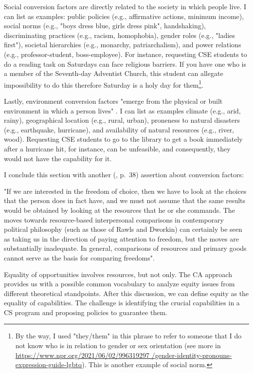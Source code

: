 Social conversion factors are directly related to the society in which people live. I can list as examples: public policies (e.g., affirmative actions, minimum income), social norms (e.g., "boys dress blue, girls dress pink", handshaking), discriminating practices (e.g., racism, homophobia), gender roles (e.g., "ladies first"), societal hierarchies (e.g., monarchy, patriarchalism), and power relations (e.g., professor-student, boss-employee). For instance, requesting \gls{CSE} students to do a reading task on Saturdays can face religious barriers. If you have one who is a member of the Seventh-day Adventist Church, this student can allegate impossibility to do this therefore Saturday is a holy day for them\footnote{By the way, I used "they/them" in this phrase to refer to someone that I do not know who is in relation to gender or sex orientation (see more in \url{https://www.npr.org/2021/06/02/996319297 /gender-identity-pronouns-expression-guide-lgbtq}). This is another example of social norm.}.

Lastly, environment conversion factors "emerge from the physical or built environment in which a person lives" \cite{robeyns:2023}. I can list as examples climate (e.g., arid, rainy), geographical location (e.g., rural, urban), proneness to natural disasters (e.g., earthquake, hurricane), and availability of natural resources (e.g., river, wood). Requesting \gls{CSE} students to go to the library to get a book immediately after a hurricane hit, for instance, can be unfeasible, and consequently, they would not have the capability for it.

I conclude this section with another  (\citeyear{sen:1992}, p.~38) assertion about conversion factors: 
\begin{citacao}
    "If we are interested in the freedom of choice, then we have to look at the choices that the person does in fact have, and we must not assume that the same results would be obtained by looking at the resources that he or she commands. The moves towards resource-based interpersonal comparisons in contemporary political philosophy (such as those of Rawls and Dworkin) can certainly be seen as taking us in the direction of paying attention to freedom, but the moves are substantially inadequate. In general, comparisons of resources and primary goods cannot serve as the basis for comparing freedoms".
\end{citacao}
Equality of opportunities involves resources, but not only. The \gls{CA} approach provides us with a possible common vocabulary to analyze equity issues from different theoretical standpoints. After this discussion, we can define equity as the equality of capabilities. The challenge is identifying the crucial capabilities in a \gls{CS} program and proposing policies to guarantee them.

